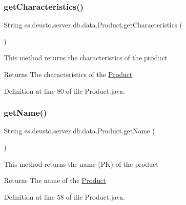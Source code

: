 \subsubsection{\texorpdfstring{get\+Characteristics()}{getCharacteristics()}}
{\footnotesize\ttfamily String es.\+deusto.\+server.\+db.\+data.\+Product.\+get\+Characteristics (\begin{DoxyParamCaption}{ }\end{DoxyParamCaption})}

This method returns the characteristics of the product \begin{DoxyReturn}{Returns}
The characteristics of the \hyperlink{classes_1_1deusto_1_1server_1_1db_1_1data_1_1_product}{Product} 
\end{DoxyReturn}


Definition at line 80 of file Product.\+java.

\mbox{\label{classes_1_1deusto_1_1server_1_1db_1_1data_1_1_product_a140ac892e13b36b2c6da61b3abb06f4e}} 
\subsubsection{\texorpdfstring{get\+Name()}{getName()}}
{\footnotesize\ttfamily String es.\+deusto.\+server.\+db.\+data.\+Product.\+get\+Name (\begin{DoxyParamCaption}{ }\end{DoxyParamCaption})}

This method returns the name (PK) of the product \begin{DoxyReturn}{Returns}
The name of the \hyperlink{classes_1_1deusto_1_1server_1_1db_1_1data_1_1_product}{Product} 
\end{DoxyReturn}


Definition at line 58 of file Product.\+java.

\mbox{\label{classes_1_1deusto_1_1server_1_1db_1_1data_1_1_product_a68feb5bdb4b611fecd9c07eee9217ac6}} 
